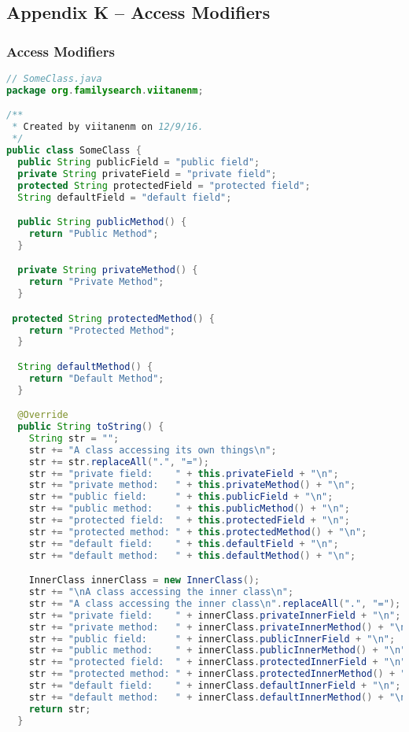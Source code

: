 \subsection*{Appendix K -- Access Modifiers}
\subsubsection{Access Modifiers}\label{App:AppendixKClasses}
\begin{lstlisting}[language=Java]
// SomeClass.java
package org.familysearch.viitanenm;

/**
 * Created by viitanenm on 12/9/16.
 */
public class SomeClass {
  public String publicField = "public field";
  private String privateField = "private field";
  protected String protectedField = "protected field";
  String defaultField = "default field";

  public String publicMethod() {
    return "Public Method";
  }

  private String privateMethod() {
    return "Private Method";
  }

 protected String protectedMethod() {
    return "Protected Method";
  }

  String defaultMethod() {
    return "Default Method";
  }

  @Override
  public String toString() {
    String str = "";
    str += "A class accessing its own things\n";
    str += str.replaceAll(".", "=");
    str += "private field:    " + this.privateField + "\n";
    str += "private method:   " + this.privateMethod() + "\n";
    str += "public field:     " + this.publicField + "\n";
    str += "public method:    " + this.publicMethod() + "\n";
    str += "protected field:  " + this.protectedField + "\n";
    str += "protected method: " + this.protectedMethod() + "\n";
    str += "default field:    " + this.defaultField + "\n";
    str += "default method:   " + this.defaultMethod() + "\n";

    InnerClass innerClass = new InnerClass();
    str += "\nA class accessing the inner class\n";
    str += "A class accessing the inner class\n".replaceAll(".", "=");
    str += "private field:    " + innerClass.privateInnerField + "\n";
    str += "private method:   " + innerClass.privateInnerMethod() + "\n";
    str += "public field:     " + innerClass.publicInnerField + "\n";
    str += "public method:    " + innerClass.publicInnerMethod() + "\n";
    str += "protected field:  " + innerClass.protectedInnerField + "\n";
    str += "protected method: " + innerClass.protectedInnerMethod() + "\n";
    str += "default field:    " + innerClass.defaultInnerField + "\n";
    str += "default method:   " + innerClass.defaultInnerMethod() + "\n";
    return str;
  }


\end{lstlisting}
